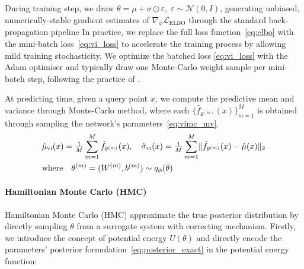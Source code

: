 \documentclass[preprint,12pt]{elsarticle}
\begin{document}
During training step, we draw
\(
\theta=\mu+\sigma\odot\varepsilon,\;
\varepsilon\sim\mathcal N(0,I)
\),
generating unbiased, numerically-stable gradient estimates of
$\nabla_{\!\phi}\mathcal L_{\mathrm{ELBO}}$ through the standard
back-propagation pipeline %
In practice, we replace the full loss function~\eqref{eq:elbo} with the mini-batch loss~\eqref{eq:vi_loss} to accelerate the training process by allowing mild training stochasticity. We optimize the batched loss \eqref{eq:vi_loss} with the Adam optimiser and typically
draw one Monte-Carlo weight sample per mini-batch step, following the
practice of \cite{yang_b-pinns_2021}.






At predicting time, given a query point $x$, we compute the predictive mean and variance through Monte-Carlo method, where each $\{\hat f_{\theta^{(m)}}(x)\}_{m=1}^{M}$ is obtained through sampling the network's parameters~\eqref{eq:vimc_mv}. 
\begin{equation}
    \begin{aligned}
    &\hat\mu_{\textsc{vi}}(x)=\tfrac1M\sum_{m=1}^{M}\hat f_{\theta^{(m)}}(x),
    \quad
    \hat\sigma_{\textsc{vi}}(x)=
    \tfrac1{M}\sum_{m=1}^{M}
    \lVert \hat f_{\theta^{(m)}}(x)-\hat\mu(x)\rVert_2 \\
    &\text{where} \quad
    \theta^{(m)} = (W^{(m)}, b^{(m)}) \sim q_{\phi}(\theta) 
    \label{eq:vimc_mv}
    \end{aligned}
\end{equation}
\noindent

\paragraph{Hamiltonian Monte Carlo (HMC)}
\label{sec:sub:hmc}
Hamiltonian Monte Carlo (HMC) approximate the true posterior distribution by directly sampling $\theta$ from a surrogate system with correcting mechanism. Firstly, we introduce the concept of potential energy $U(\theta)$ and directly encode the parameters' posterior formulation~\eqref{eq:posterior_exact} in the potential energy function:
\end{document}
